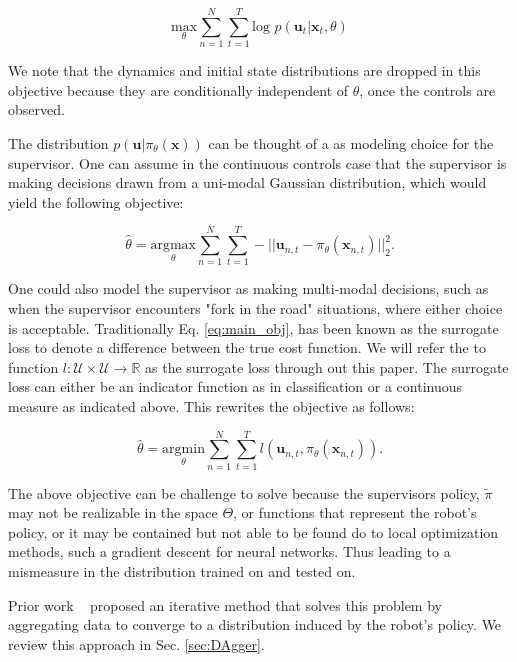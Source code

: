 \documentclass[10pt, conference]{ieeeconf}      %
\newcommand{\bu}{\mathbf{u}}
\newcommand{\bx}{\mathbf{x}}
\begin{document}
$$\underset{\theta}{\mbox{max}} \sum^N_{n=1}\sum^T_{t=1}\mbox{log }p(\bu_t|\bx_t,\theta)$$

We note that the dynamics and initial state distributions are dropped in this objective because they are conditionally independent of $\theta$, once the controls are observed. 

The distribution $p(\bu|\pi_\theta(\bx))$ can be thought of a as modeling choice for the supervisor. One can assume in the continuous controls case that the supervisor is making decisions drawn from a uni-modal Gaussian distribution, which would yield the following objective:

\begin{equation}\label{eq:main_obj}
\hat{\theta} = \underset{\theta}{\mbox{argmax}} \sum^N_{n=1}\sum^T_{t=1}-|| \bu_{n,t} - \pi_{\theta} (\bx_{n,t})||^2_2.
\end{equation}

One could also model the supervisor as making multi-modal decisions, such as when the supervisor encounters "fork in the road" situations, where either choice is acceptable. Traditionally  Eq. \ref{eq:main_obj}, has been known as the surrogate loss to denote a difference between the true cost function. We will refer the to function $l : \mathcal{U} \times \mathcal{U} \rightarrow \mathbb{R}$ as the surrogate loss through out this paper. The surrogate loss can either be an indicator function as in classification or a continuous measure as indicated above.  This rewrites the objective as follows: 

\begin{equation}\label{eq:main_obj}
\hat{\theta} = \underset{\theta}{\mbox{argmin}} \sum^N_{n=1}\sum^T_{t=1} l(\bu_{n,t}, \pi_{\theta} (\bx_{n,t})).
\end{equation}


 The above objective can be challenge to solve because the supervisors policy, $\tilde{\pi}$ may not be realizable in the space $\Theta$, or functions that represent the robot's policy, or it may be contained but not able to be found do to local optimization methods, such a gradient descent for neural networks.  Thus leading to a mismeasure in the distribution trained on and tested on. 
 
 Prior work ~\cite{ross2010reduction}  proposed an iterative method that solves this problem by aggregating data to converge to a distribution induced by the robot's policy. We review this approach in Sec. \ref{sec:DAgger}.
 
\end{document}
